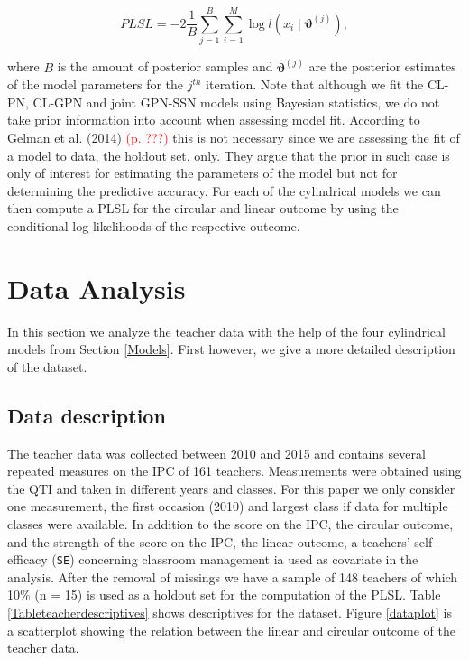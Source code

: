\documentclass[11pt,]{article}
\begin{document}
\begin{equation}\label{PLSLBayes}
PLSL = -2 \frac{1}{B} \sum_{j = 1}^{B}\sum_{i = 1}^{M} \log l(x_i \mid \boldsymbol{\vartheta}^{(j)}),
\end{equation}

where \(B\) is the amount of posterior samples and
\(\boldsymbol{\vartheta}^{(j)}\) are the posterior estimates of the
model parameters for the \(j^{th}\) iteration. Note that although we fit
the CL-PN, CL-GPN and joint GPN-SSN models using Bayesian statistics, we
do not take prior information into account when assessing model fit.
According to Gelman et al. (2014) \textcolor{red}{(p. ???)} this is not
necessary since we are assessing the fit of a model to data, the holdout
set, only. They argue that the prior in such case is only of interest
for estimating the parameters of the model but not for determining the
predictive accuracy. For each of the cylindrical models we can then
compute a PLSL for the circular and linear outcome by using the
conditional log-likelihoods of the respective outcome.

\section{Data Analysis}\label{DataAnalysis}

In this section we analyze the teacher data with the help of the four
cylindrical models from Section \ref{Models}. First however, we give a
more detailed description of the dataset.

\subsection{Data description}\label{DataDescriptives}

The teacher data was collected between 2010 and 2015 and contains
several repeated measures on the IPC of 161 teachers. Measurements were
obtained using the QTI and taken in different years and classes. For
this paper we only consider one measurement, the first occasion (2010)
and largest class if data for multiple classes were available. In
addition to the score on the IPC, the circular outcome, and the strength
of the score on the IPC, the linear outcome, a teachers' self-efficacy
(\verb|SE|) concerning classroom management ia used as covariate in the
analysis. After the removal of missings we have a sample of 148 teachers
of which 10\% (n = 15) is used as a holdout set for the computation of
the PLSL. Table \ref{Tableteacherdescriptives} shows descriptives for
the dataset. Figure \ref{dataplot} is a scatterplot showing the relation
between the linear and circular outcome of the teacher data.
\end{document}
